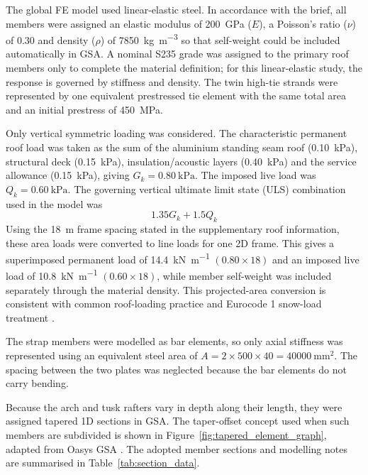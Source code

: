 \documentclass[10pt,a4paper]{article}
\begin{document}
The global FE model used linear-elastic steel. In accordance with the brief, all members were assigned an elastic modulus of \SI{200}{\giga\pascal} (\(E\)), a Poisson's ratio (\(\nu\)) of 0.30 and density (\(\rho\)) of \SI{7850}{\kilogram\per\metre\cubed} so that self-weight could be included automatically in GSA. A nominal S235 grade was assigned to the primary roof members only to complete the material definition; for this linear-elastic study, the response is governed by stiffness and density. The twin high-tie strands were represented by one equivalent prestressed tie element with the same total area and an initial prestress of \SI{450}{\mega\pascal}.

Only vertical symmetric loading was considered. The characteristic permanent roof load was taken as the sum of the aluminium standing seam roof (\SI{0.10}{\kilo\pascal}), structural deck (\SI{0.15}{\kilo\pascal}), insulation/acoustic layers (\SI{0.40}{\kilo\pascal}) and the service allowance (\SI{0.15}{\kilo\pascal}), giving $G_k = \SI{0.80}{\kilo\pascal}$. The imposed live load was $Q_k = \SI{0.60}{\kilo\pascal}$. The governing vertical ultimate limit state (ULS) combination used in the model was
\begin{equation}
1.35G_k + 1.5Q_k
\label{eq:uls_vertical_combination}
\end{equation}
Using the \SI{18}{\metre} frame spacing stated in the supplementary roof information, these area loads were converted to line loads for one 2D frame. This gives a superimposed permanent load of \SI{14.4}{\kilo\newton\per\metre} $(0.80 \times 18)$ and an imposed live load of \SI{10.8}{\kilo\newton\per\metre} $(0.60 \times 18)$, while member self-weight was included separately through the material density. This projected-area conversion is consistent with common roof-loading practice and Eurocode 1 snow-load treatment \cite{bsen_snow}.

The strap members were modelled as bar elements, so only axial stiffness was represented using an equivalent steel area of $A = 2 \times 500 \times 40 = \SI{40000}{\milli\metre\squared}$. The spacing between the two plates was neglected because the bar elements do not carry bending.

Because the arch and tusk rafters vary in depth along their length, they were assigned tapered 1D sections in GSA. The taper-offset concept used when such members are subdivided is shown in Figure~\ref{fig:tapered_element_graph}, adapted from Oasys GSA \cite{gsa_tapered_elements}. The adopted member sections and modelling notes are summarised in Table~\ref{tab:section_data}.
\end{document}
